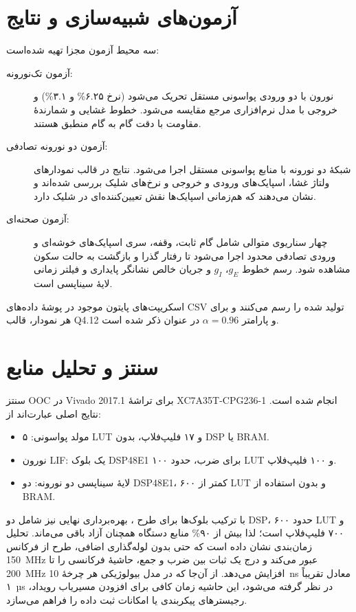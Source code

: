 \documentclass[12pt,a4paper]{article}
\begin{document}
\section{آزمون‌های شبیه‌سازی و نتایج}
سه محیط آزمون مجزا تهیه شده‌است:
\begin{description}
  \item[آزمون تک‌نورونه:] نورون با دو ورودی پواسونی مستقل تحریک می‌شود (نرخ ۶.۲۵\% و ۳.۱\%) و خروجی با مدل نرم‌افزاری مرجع مقایسه می‌شود. خطوط غشایی و شمارندهٔ مقاومت با دقت گام به گام منطبق هستند.
  \item[آزمون دو نورونه تصادفی:] شبکهٔ دو نورونه با منابع پواسونی مستقل اجرا می‌شود. نتایج در قالب نمودارهای ولتاژ غشا، اسپایک‌های ورودی و خروجی و نرخ‌های شلیک بررسی شده‌اند و نشان می‌دهند که هم‌زمانی اسپایک‌ها نقش تعیین‌کننده‌ای در شلیک دارد.
  \item[آزمون صحنه‌ای:] چهار سناریوی متوالی شامل گام ثابت، وقفه، سری اسپایک‌های خوشه‌ای و ورودی تصادفی محدود اجرا می‌شود تا رفتار گذرا و بازگشت به حالت سکون مشاهده شود. رسم خطوط $g_E$، $g_I$ و جریان خالص نشانگر پایداری و فیلتر زمانی لایهٔ سیناپسی است.
\end{description}
اسکریپت‌های پایتون موجود در پوشهٔ  داده‌های CSV تولید شده را رسم می‌کنند و برای هر نمودار، قالب Q4.12 و پارامتر $\alpha=0.96$ در عنوان ذکر شده است.

\section{سنتز و تحلیل منابع}
سنتز OOC در Vivado 2017.1 برای تراشهٔ XC7A35T-CPG236-1 انجام شده است. نتایج اصلی عبارت‌اند از:
\begin{itemize}
  \item مولد پواسونی: ۵ LUT و ۱۷ فلیپ‌فلاپ، بدون DSP یا BRAM.
  \item نورون LIF: یک بلوک DSP48E1 برای ضرب، حدود ۱۰۰ LUT و ۱۰۰ فلیپ‌فلاپ.
  \item لایهٔ سیناپسی دو نورونه: دو DSP48E1، کمتر از ۶۰۰ LUT و بدون استفاده از BRAM.
\end{itemize}
با ترکیب بلوک‌ها برای طرح ، بهره‌برداری نهایی نیز شامل دو DSP، حدود ۶۰۰ LUT و ۷۰۰ فلیپ‌فلاپ است؛ لذا بیش از ۹۰\% منابع دستگاه همچنان آزاد باقی می‌ماند. تحلیل زمان‌بندی نشان داده است که حتی بدون لوله‌گذاری اضافی، طرح از فرکانس 150~MHz عبور می‌کند و درج یک ثبات بین ضرب و جمع، حاشیهٔ فرکانسی را تا 200~MHz افزایش می‌دهد. از آن‌جا که در مدل بیولوژیکی هر چرخهٔ 10~ns معادل تقریباً ۱~µs در نظر گرفته می‌شود، این حاشیه زمان کافی برای افزودن مسیریاب رویداد، رجیسترهای پیکربندی یا امکانات ثبت داده را فراهم می‌سازد.
\end{document}
